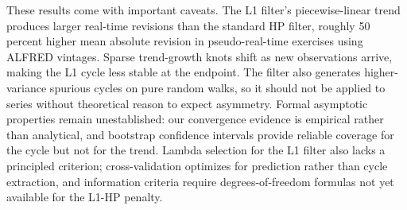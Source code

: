 \documentclass[10pt]{article}
\begin{document}
These results come with important caveats. The L1 filter's piecewise-linear trend produces larger real-time revisions than the standard HP filter, roughly 50 percent higher mean absolute revision in pseudo-real-time exercises using ALFRED vintages. Sparse trend-growth knots shift as new observations arrive, making the L1 cycle less stable at the endpoint. The filter also generates higher-variance spurious cycles on pure random walks, so it should not be applied to series without theoretical reason to expect asymmetry. Formal asymptotic properties remain unestablished: our convergence evidence is empirical rather than analytical, and bootstrap confidence intervals provide reliable coverage for the cycle but not for the trend. Lambda selection for the L1 filter also lacks a principled criterion; cross-validation optimizes for prediction rather than cycle extraction, and information criteria require degrees-of-freedom formulas not yet available for the L1-HP penalty.
\end{document}

